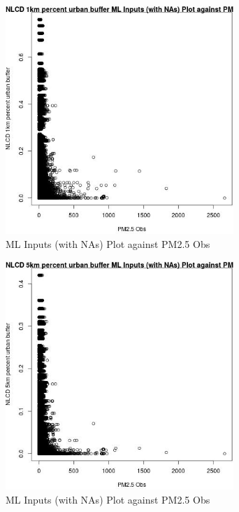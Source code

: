 \begin{figure} 
\centering  
\includegraphics[width=0.77\textwidth]{Code_Outputs/Report_ML_input_PM25_Step4_part_e_de_duplicated_aves_compiled_2019-05-21wNAs_NLCD_1km_percent_urban_buffervPM25_Obs.jpg} 
\caption{\label{fig:Report_ML_input_PM25_Step4_part_e_de_duplicated_aves_compiled_2019-05-21wNAsNLCD_1km_percent_urban_buffervPM25_Obs}ML Inputs (with NAs) Plot against PM2.5 Obs} 
\end{figure} 
 

\begin{figure} 
\centering  
\includegraphics[width=0.77\textwidth]{Code_Outputs/Report_ML_input_PM25_Step4_part_e_de_duplicated_aves_compiled_2019-05-21wNAs_NLCD_5km_percent_urban_buffervPM25_Obs.jpg} 
\caption{\label{fig:Report_ML_input_PM25_Step4_part_e_de_duplicated_aves_compiled_2019-05-21wNAsNLCD_5km_percent_urban_buffervPM25_Obs}ML Inputs (with NAs) Plot against PM2.5 Obs} 
\end{figure} 
 

